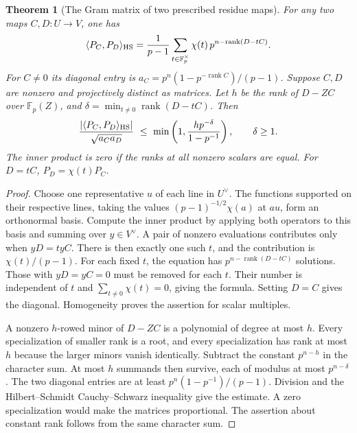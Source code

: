 \documentclass[a4paper,11pt]{article}
\newtheorem{theorem}[proposition]{Theorem}
\theoremstyle{definition}
\theoremstyle{remark}
\numberwithin{equation}{section}
\begin{document}
\begin{theorem}[The Gram matrix of two prescribed residue maps]
\leavevmode\label{thm:twopencils521}
For any two maps \(C,D:U\to V\), one has
\[
 \langle P_C,P_D\rangle_{\rm HS}
   =\frac1{p-1}\sum_{t\in\mathbb F_p^\times}\chi(t)\,
                     p^{n-\operatorname{rank}(D-tC)} .
\]
For \(C\ne0\) its diagonal entry is
\(a_C=p^n(1-p^{-\operatorname{rank}C})/(p-1)\).
Suppose \(C,D\) are nonzero and projectively distinct as matrices.
Let \(h\) be the rank of \(D-ZC\) over \(\mathbb F_p(Z)\), and
\(\delta=\min_{t\ne0}\operatorname{rank}(D-tC)\). Then
\[
 \frac{|\langle P_C,P_D\rangle_{\rm HS}|}{\sqrt{a_Ca_D}}
 \ \le\ \min\left(1,\frac{h p^{-\delta}}{1-p^{-1}}\right),
 \qquad \delta\ge1.
\]
The inner product is zero if the ranks at all nonzero scalars are
equal. For \(D=tC\), \(P_D=\chi(t)P_C\).
\end{theorem}
\begin{proof}
Choose one representative \(u\) of each line in \(U^\vee\). The
functions supported on their respective lines, taking the values
\((p-1)^{-1/2}\chi(a)\) at \(au\), form an orthonormal basis. Compute
the inner product by applying both operators to this basis and summing
over \(y\in V^\vee\). A pair of nonzero evaluations contributes only
when \(yD=t yC\). There is then exactly one such \(t\), and the
contribution is \(\chi(t)/(p-1)\). For each fixed \(t\), the equation
has \(p^{n-\operatorname{rank}(D-tC)}\) solutions. Those with
\(yD=yC=0\) must be removed for each \(t\). Their number is independent
of \(t\) and \(\sum_{t\ne0}\chi(t)=0\), giving the formula. Setting
\(D=C\) gives the diagonal. Homogeneity proves the assertion for
scalar multiples.

A nonzero \(h\)-rowed minor of \(D-ZC\) is a polynomial of degree
at most \(h\). Every specialization of smaller rank is a root, and
every specialization has rank at most \(h\) because the larger
minors vanish identically. Subtract the constant \(p^{n-h}\) in the
character sum. At most \(h\) summands then survive, each of modulus
at most \(p^{n-\delta}\). The two diagonal entries are at least
\(p^n(1-p^{-1})/(p-1)\). Division and the Hilbert--Schmidt
Cauchy--Schwarz inequality give the estimate. A zero specialization
would make the matrices proportional. The assertion about constant
rank follows from the same character sum.
\end{proof}
\end{document}
